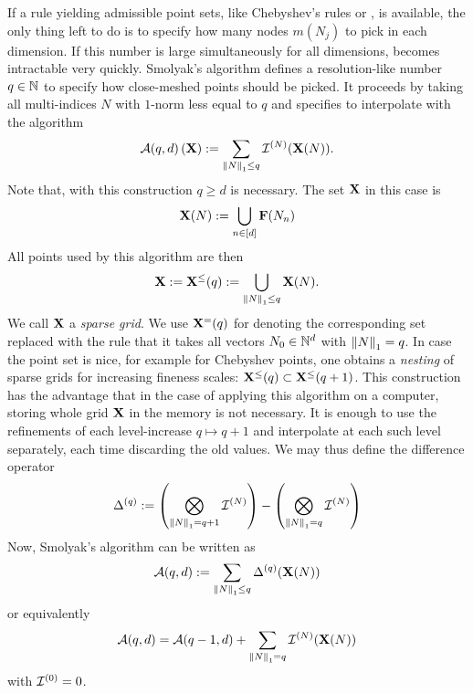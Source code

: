 \documentclass[12pt, oneside]{amsart}
\theoremstyle{definition}
\theoremstyle{remark}
\numberwithin{equation}{section}
\begin{document}
If a rule yielding admissible point sets, like Chebyshev's rules 
 or , is available, the only thing 
left to do is to specify how many nodes $m(N_j)$ to pick in each 
dimension. If this number is large simultaneously for all dimensions,
 becomes intractable very quickly. Smolyak's 
algorithm defines a resolution-like number \(q \in \N\) to specify how 
close-meshed points should be picked. It proceeds by taking all multi-indices 
\(N\) with \(1\)-norm less equal to \(q\) and specifies to interpolate 
with the algorithm %
\begin{equation}\label{eq:smolyak}
    \cA(q, d)\left(\XX\right) \defn \sum_{\norm[1]{N} \leq q} \cI^{(N)}(\XX(N)).
\end{equation}
Note that, with this construction \(q \geq d\) is necessary. The set \(\XX\) in 
this case is %
\begin{equation}\label{eq:indexGrid}
    \XX(N) \defn \bigcup_{n \in [d]} \FF(N_n)
\end{equation}
All points used by this algorithm are then
\begin{equation}\label{eq:sparseGrid}
    \XX \defn \XX^{\leq}(q) \defn \bigcup_{\norm[1]{N} \leq q} \XX(N).
\end{equation}
We call \(\XX\) a \emph{sparse grid}. We use \(\XX^{=}(q)\) for denoting the 
corresponding set replaced with the rule that it takes all vectors \(N_0\in\N^d 
\) with \(\norm[1]{N} = q\). In case the point set is nice, for example for 
Chebyshev points, one obtains a \emph{nesting} of sparse grids for increasing 
fineness scales: \(\XX^{\leq}(q) \subset \XX^{\leq}(q+1)\). This construction 
has the advantage that in the case of applying this algorithm on a computer, 
storing whole grid $\XX$ in the memory is not necessary. It is enough to use 
the refinements of each level-increase \(q \mapsto q+1\) and interpolate at 
each such level separately, each time discarding the 
old values. We may thus define the difference operator
\begin{equation}\label{eq:differenceOp}
    \Delta^{(q)} \defn \left( \bigotimes_{\norm[1]{N}=q+1} \cI^{(N)} \right) - \left( \bigotimes_{\norm[1]{N} = q} \cI^{(N)} \right)
\end{equation}
Now, Smolyak's algorithm can be written as
\begin{equation}\label{eq:SmolyakWithDifferences1}
    \cA(q, d) \defn \sum_{\norm[1]{N} \leq q} \Delta^{(q)}(\XX(N))
\end{equation}
or equivalently
\begin{equation}\label{eq:SmolyakWithDifferences2}
    \cA(q, d) = \cA(q-1, d) + \sum_{\norm[1]{N}=q} \cI^{(N)}(\XX(N))
\end{equation}
with \(\cI^{(0)} = 0\).
\end{document}
